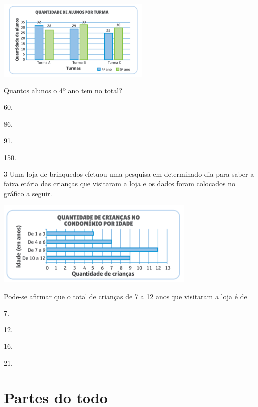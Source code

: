 \begin{mdframed}[linewidth=2pt,linecolor=salmao,roundcorner=2pt]
\begin{escolha}
{\includegraphics[width=2.89744in,height=1.52156in]{media/image104.png}

Quantos alunos o 4º ano tem no total?

\begin{escolha}
\item
  60.
\item
  86.
\item
  91.
\item
  150.
\end{escolha}



\num{3} Uma loja de brinquedos efetuou uma pesquisa em determinado dia para
saber a faixa etária das crianças que visitaram a loja e os dados foram
colocados no gráfico a seguir.

\includegraphics[width=3.77564in,height=1.60972in]{media/image105.png}

Pode-se afirmar que o total de crianças
de 7 a 12 anos que visitaram a loja é de

\begin{escolha}
\item
  7.
\item
  12.
\item
  16.
\item
  21.
\end{escolha}



\chapter{Partes do todo}


}
\end{escolha}
\end{mdframed}
